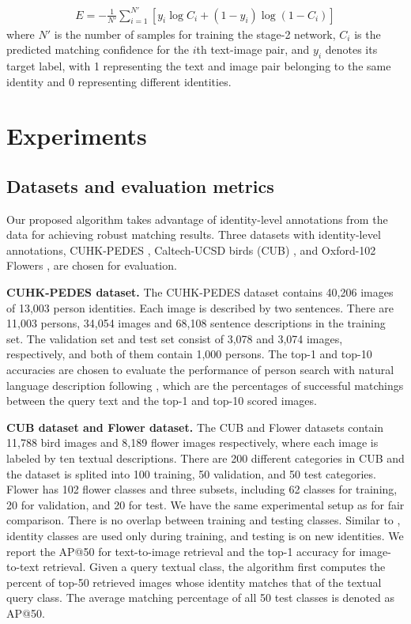 \begin{align}
  E = -\frac{1}{N'}\sum_{i=1}^{N'} \left[ y_i \log C_i  + (1-y_i) \log (1-C_i) \right]
\end{align}
where $N'$ is the number of samples for training the stage-2 network, $C_i$ is the predicted matching confidence for the $i$th text-image pair, and $y_i$ denotes its target label, with 1 representing the text and image pair belonging to the same identity and 0 representing different identities.

\section{Experiments}
\subsection{Datasets and evaluation metrics}
Our proposed algorithm takes advantage of identity-level annotations from the data for achieving robust matching results. Three datasets with identity-level annotations, CUHK-­PEDES \cite{li2017person}, Caltech-UCSD birds (CUB) \cite{reed2016learning}, and Oxford-102 Flowers \cite{reed2016learning}, are chosen for evaluation.

\textbf{CUHK-­PEDES dataset.}
The CUHK-­PEDES dataset \cite{li2017person} contains 40,206 images of 13,003 person identities. Each image is described by two sentences.
There are 11,003 persons, 34,054 images and 68,108 sentence descriptions in the training set. The validation set and test set consist of 3,078 and 3,074 images, respectively, and both of them contain 1,000 persons. The top-1 and top-10 accuracies are chosen to evaluate the performance of person search with natural language description following \cite{li2017person}, which are the percentages of successful matchings between the query text and the top-1 and top-10 scored images. %

\textbf{CUB dataset and Flower dataset.}
The CUB and Flower datasets contain 11,788 bird images and 8,189 flower images respectively, where each image is labeled by ten textual descriptions. There are 200 different categories in CUB and the dataset is splited into 100 training, 50 validation, and 50 test categories. Flower has 102 flower classes and three subsets, including 62 classes for training, 20 for validation, and 20 for test.
We have the same experimental setup as \cite{reed2016learning} for fair comparison. There is no overlap between training and testing classes. Similar to \cite{reed2016learning}, identity classes are used only during training, and testing is on new identities.
We report the AP@50 for text-to-image retrieval and the top-1 accuracy for image-to-text retrieval. Given a query textual class, the algorithm first computes the percent of top-50 retrieved images whose identity matches that of the textual query class. The average matching percentage of all 50 test classes is denoted as AP@50.


